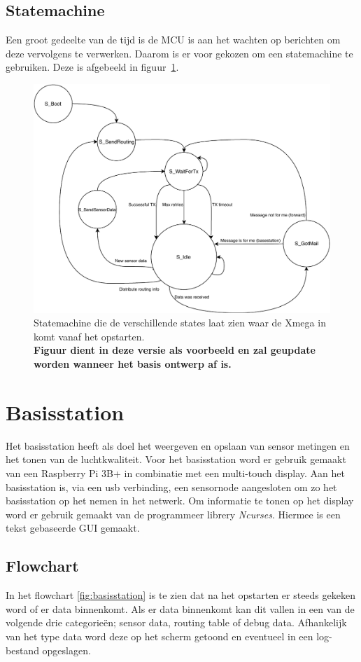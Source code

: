 \documentclass[a4paper, 11pt]{article}
\begin{document}
\subsection{Statemachine}
Een groot gedeelte van de tijd is de MCU is aan het wachten op berichten om deze vervolgens te verwerken. Daarom is er voor gekozen om een statemachine te gebruiken. Deze is afgebeeld in figuur~\ref{fig:Statemachine}.


\begin{figure}[!ht]
	\includegraphics[width=.8\textwidth, keepaspectratio]{media/PState.pdf}
    \caption{Statemachine die de verschillende states laat zien waar de Xmega in komt vanaf het opstarten.\\ \textbf{Figuur dient in deze versie als voorbeeld en zal geupdate worden wanneer het basis ontwerp af is.}}
    \label{fig:Statemachine}
\end{figure}

\section{Basisstation}
Het basisstation heeft als doel het weergeven en opslaan van sensor metingen en het tonen van de luchtkwaliteit.
Voor het basisstation word er gebruik gemaakt van een Raspberry Pi 3B+ in combinatie met een multi-touch display. Aan het basisstation is, via een usb verbinding, een sensornode aangesloten om zo het basisstation op het nemen in het netwerk.
Om informatie te tonen op het display word er gebruik gemaakt van de programmeer librery \textsl{Ncurses}. Hiermee is een tekst gebaseerde GUI gemaakt.

\subsection{Flowchart}
In het flowchart \ref{fig:basisstation} is te zien dat na het opstarten er steeds gekeken word of er data binnenkomt. Als er data binnenkomt kan dit vallen in een van de volgende drie categorieën; sensor data, routing table of debug data. Afhankelijk van het type data word deze op het scherm getoond en eventueel in een log-bestand opgeslagen.
\end{document}

